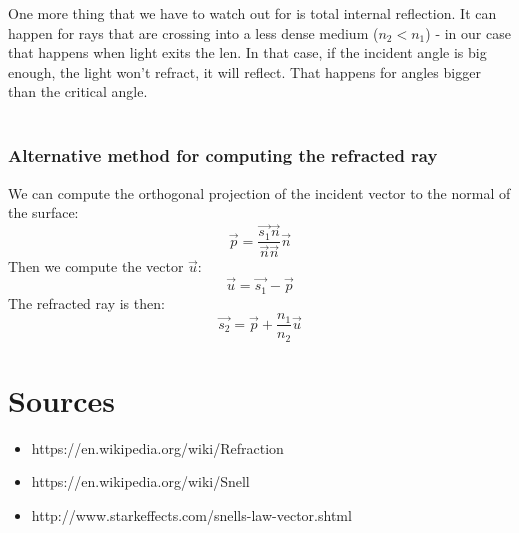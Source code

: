 \documentclass[A4]{article}
\begin{document}
One more thing that we have to watch out for is total internal reflection. It can happen for rays that are crossing into a less dense medium ($n_2 < n_1$) - in our case that happens when light exits the len. In that case, if the incident angle is big enough, the light won't refract, it will reflect. That happens for angles bigger than the critical angle. \\\\
\subsubsection{Alternative method for computing the refracted ray}
We can compute the orthogonal projection of the incident vector to the normal of the surface:
\[
	\vec{p} = \dfrac{\vec{s_1} \vec{n}}{\vec{n} \vec{n}}\vec{n}
\]
Then we compute the vector $\vec{u}$:
\[
	\vec{u} = \vec{s_1} - \vec{p}
\]
The refracted ray is then:
\[
	\vec{s_2} = \vec{p} + \dfrac{n_1}{n_2}\vec{u}
\]
\section{Sources}
\begin{itemize}
  \item https://en.wikipedia.org/wiki/Refraction
  \item https://en.wikipedia.org/wiki/Snell%
  \item http://www.starkeffects.com/snells-law-vector.shtml
\end{itemize}
\end{document}
